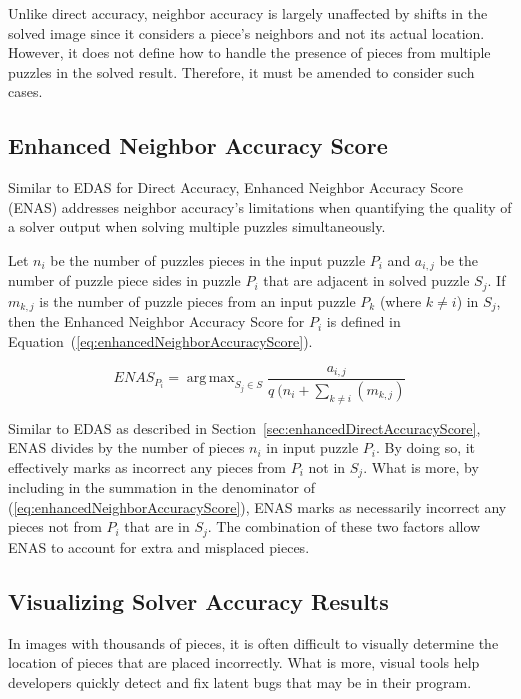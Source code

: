 \documentclass{report}
\def\eref#1{(\ref{#1})}
\DeclareMathOperator*{\argmax}{arg\,max} %
\begin{document}
Unlike direct accuracy, neighbor accuracy is largely unaffected by shifts in the solved image since it considers a piece's neighbors and not its actual location.  However, it does not define how to handle the presence of pieces from multiple puzzles in the solved result.  Therefore, it must be amended to consider such cases.

\subsection{Enhanced Neighbor Accuracy Score}\label{sec:enhancedNeighborAccuracyScore}

Similar to EDAS for Direct Accuracy, Enhanced Neighbor Accuracy Score (ENAS) addresses neighbor accuracy's limitations when quantifying the quality of a solver output when solving multiple puzzles simultaneously. 

Let $n_i$ be the number of puzzles pieces in the input puzzle $P_i$ and $a_{i,j}$ be the number of puzzle piece sides in puzzle $P_i$ that are adjacent in solved puzzle $S_j$.  If $m_{k,j}$ is the number of puzzle pieces from an input puzzle $P_k$ (where $k \ne i$) in $S_j$, then the Enhanced Neighbor Accuracy Score for $P_i$ is defined in Equation~\eref{eq:enhancedNeighborAccuracyScore}.

\begin{equation} \label{eq:enhancedNeighborAccuracyScore}
ENAS_{P_i} = \argmax_{S_j \in S}\frac{a_{i,j}}{q ~ (n_i + \sum_{k \ne i}(m_{k,j})}
\end{equation}

Similar to EDAS as described in Section~\ref{sec:enhancedDirectAccuracyScore}, ENAS divides by the number of pieces $n_i$ in input puzzle $P_i$.  By doing so, it effectively marks as incorrect any pieces from $P_i$ not in $S_j$.  What is more, by including in the summation in the denominator of \eref{eq:enhancedNeighborAccuracyScore}, ENAS marks as necessarily incorrect any pieces not from $P_i$ that are in $S_j$.  The combination of these two factors allow ENAS to account for extra and misplaced pieces.

\subsection{Visualizing Solver Accuracy Results}\label{sec:visualizingSolverAccuracy}

In images with thousands of pieces, it is often difficult to visually determine the location of pieces that are placed incorrectly.  What is more, visual tools help developers quickly detect and fix latent bugs that may be in their program.
\end{document}
